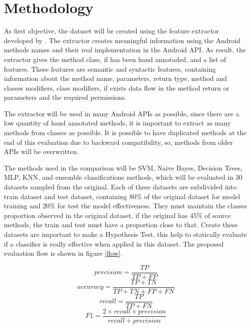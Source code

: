 \chapter{Methodology}
As first objective, the dataset will be created using the feature extractor developed by 
\cite{rasthofer2014machine}. The extractor creates meaningful information using the Android methods names and 
their real implementation in the Android API. As result, the extractor gives the method class, if has been hand 
annotaded, and a list of features. These features are semantic and syntactic features, containing information about 
the method name, parameters, return type, method and classes modifiers, class modifiers, if exists data flow in the 
method return or parameters and the required permissions.

The extractor will be used in many Android APIs as possible, since there are a low quantity of hand annotated 
methods, it is important to extract as many methods from classes as possible. It is possible to have duplicated 
methods at the end of this evaluation due to backward compatibility, so, methods from older APIs will be 
overwritten.

The methods used in the comparison will be SVM, Naive Bayes, Decision Trees, MLP, KNN, and ensemble classifications 
methods, which will be evaluated in 30 datasets sampled from the original. Each of these datasets are 
subdivided into train dataset and test dataset, containing 80\% of the original dataset for model training and 20\% 
for test the model effectiveness. They must maintain the classes proportion observed in the original dataset, if 
the original has 45\% of source methods, the train and test must have a proportion close to that. Create these 
datasets are important to make a Hypothesis Test, this help to statically evaluate if a classifier is really 
effective when applied in this dataset. The proposed evaluation flow is shown in figure \ref{flow}.

\begin{multicols}{2}%
    \noindent%
    {%
    \begin{equation} \label{precision} precision = \frac{TP}{TP+FP} \end{equation}%
    \begin{equation} \label{accuracy} accuracy = \frac{TP+TN}{TP+TN+FP+FN} \end{equation}%
    }%
    {%
    \begin{equation} \label{recall} recall = \frac{TP}{TP+FN} \end{equation}%
    \begin{equation} \label{f1} F1 = \frac{2 \times recall \times precision}{recall + precision} \end{equation}%
    }%
\end{multicols}


